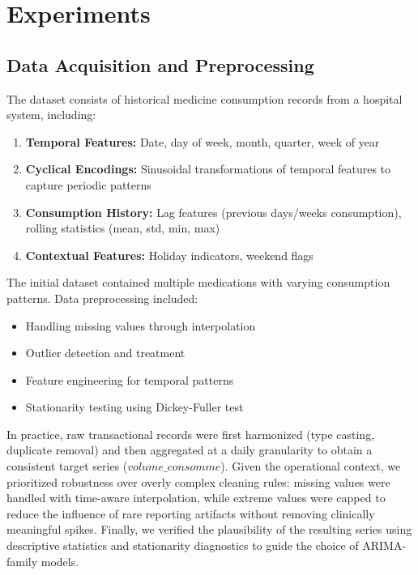 \documentclass[conference]{IEEEtran}
\begin{document}
\section{Experiments}

\subsection{Data Acquisition and Preprocessing}

The dataset consists of historical medicine consumption records from a hospital system, including:

\begin{enumerate}
    \item \textbf{Temporal Features:} Date, day of week, month, quarter, week of year
    \item \textbf{Cyclical Encodings:} Sinusoidal transformations of temporal features to capture periodic patterns
    \item \textbf{Consumption History:} Lag features (previous days/weeks consumption), rolling statistics (mean, std, min, max)
    \item \textbf{Contextual Features:} Holiday indicators, weekend flags
\end{enumerate}

The initial dataset contained multiple medications with varying consumption patterns. Data preprocessing included:

\begin{itemize}
    \item Handling missing values through interpolation
    \item Outlier detection and treatment
    \item Feature engineering for temporal patterns
    \item Stationarity testing using Dickey-Fuller test \cite{b12}
\end{itemize}

In practice, raw transactional records were first harmonized (type casting, duplicate removal) and then aggregated at a daily granularity to obtain a consistent target series (\(volume\_consomme\)). Given the operational context, we prioritized robustness over overly complex cleaning rules: missing values were handled with time-aware interpolation, while extreme values were capped to reduce the influence of rare reporting artifacts without removing clinically meaningful spikes. Finally, we verified the plausibility of the resulting series using descriptive statistics and stationarity diagnostics to guide the choice of ARIMA-family models.
\end{document}
